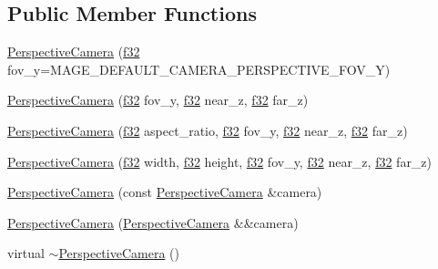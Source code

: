 \subsection*{Public Member Functions}
\begin{DoxyCompactItemize}
\item 
\hyperlink{classmage_1_1_perspective_camera_a372f98432530a1270fd8cb42ffd899c6}{Perspective\+Camera} (\hyperlink{namespacemage_a6a44ad388483959dc4dff9f2aef91431}{f32} fov\+\_\+y=M\+A\+G\+E\+\_\+\+D\+E\+F\+A\+U\+L\+T\+\_\+\+C\+A\+M\+E\+R\+A\+\_\+\+P\+E\+R\+S\+P\+E\+C\+T\+I\+V\+E\+\_\+\+F\+O\+V\+\_\+Y)
\item 
\hyperlink{classmage_1_1_perspective_camera_afc3d4ddf065a12815973d107300283f6}{Perspective\+Camera} (\hyperlink{namespacemage_a6a44ad388483959dc4dff9f2aef91431}{f32} fov\+\_\+y, \hyperlink{namespacemage_a6a44ad388483959dc4dff9f2aef91431}{f32} near\+\_\+z, \hyperlink{namespacemage_a6a44ad388483959dc4dff9f2aef91431}{f32} far\+\_\+z)
\item 
\hyperlink{classmage_1_1_perspective_camera_acfed8d5809705aeeb6973dc7887cfe3b}{Perspective\+Camera} (\hyperlink{namespacemage_a6a44ad388483959dc4dff9f2aef91431}{f32} aspect\+\_\+ratio, \hyperlink{namespacemage_a6a44ad388483959dc4dff9f2aef91431}{f32} fov\+\_\+y, \hyperlink{namespacemage_a6a44ad388483959dc4dff9f2aef91431}{f32} near\+\_\+z, \hyperlink{namespacemage_a6a44ad388483959dc4dff9f2aef91431}{f32} far\+\_\+z)
\item 
\hyperlink{classmage_1_1_perspective_camera_aaaf695070bf0a58da034bcd28bcf61e1}{Perspective\+Camera} (\hyperlink{namespacemage_a6a44ad388483959dc4dff9f2aef91431}{f32} width, \hyperlink{namespacemage_a6a44ad388483959dc4dff9f2aef91431}{f32} height, \hyperlink{namespacemage_a6a44ad388483959dc4dff9f2aef91431}{f32} fov\+\_\+y, \hyperlink{namespacemage_a6a44ad388483959dc4dff9f2aef91431}{f32} near\+\_\+z, \hyperlink{namespacemage_a6a44ad388483959dc4dff9f2aef91431}{f32} far\+\_\+z)
\item 
\hyperlink{classmage_1_1_perspective_camera_a198d1460d9312af27ed6ef2ac28b616d}{Perspective\+Camera} (const \hyperlink{classmage_1_1_perspective_camera}{Perspective\+Camera} \&camera)
\item 
\hyperlink{classmage_1_1_perspective_camera_a04531e5b956e72300337571e0eb7143d}{Perspective\+Camera} (\hyperlink{classmage_1_1_perspective_camera}{Perspective\+Camera} \&\&camera)
\item 
virtual \hyperlink{classmage_1_1_perspective_camera_a47ba88d7458528795dd832474cdb3eb9}{$\sim$\+Perspective\+Camera} ()

\end{DoxyCompactItemize}
